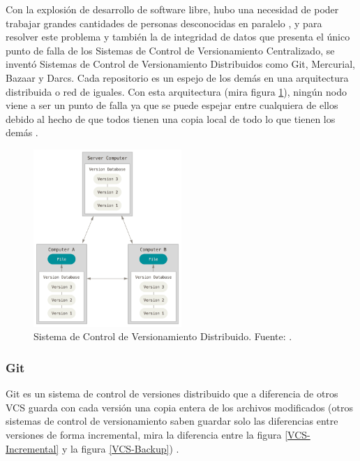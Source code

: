 Con la explosión de desarrollo de software libre, hubo una necesidad de poder trabajar grandes cantidades de personas desconocidas en paralelo \citep{raymond1999cathedral}, y para resolver este problema y también la de integridad de datos que presenta el único punto de falla de los Sistemas de Control de Versionamiento Centralizado, se inventó Sistemas de Control de Versionamiento Distribuidos como Git, Mercurial, Bazaar y Darcs. Cada repositorio es un espejo de los demás en una arquitectura distribuida o red de iguales. Con esta arquitectura (mira figura \ref{DVCS}), ningún nodo viene a ser un punto de falla ya que se puede espejar entre cualquiera de ellos debido al hecho de que todos tienen una copia local de todo lo que tienen los demás \citep{PROGIT-Git-VCS}. 

\begin{figure}
  \begin{center}
      \includegraphics[width=0.5\textwidth]{Figures/dvcs.png}
  \end{center}
  \caption{Sistema de Control de Versionamiento Distribuido. Fuente: \citep{PROGIT-Git-VCS}.}
  \label{DVCS}
\end{figure}

\subsubsection{Git}
Git es un sistema de control de versiones distribuido que a diferencia de otros VCS guarda con cada versión una copia entera de los archivos modificados (otros sistemas de control de versionamiento saben guardar solo las diferencias entre versiones de forma incremental, mira la diferencia entre la figura \ref{VCS-Incremental} y la figura \ref{VCS-Backup}) \citep{PROGIT-Git-Intro}.

